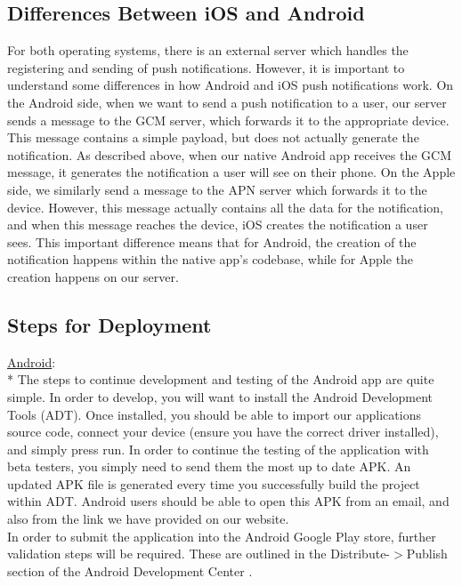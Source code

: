\documentclass[12pt,letterpaper,titlepage]{article}
\begin{document}
\subsection{Differences Between iOS and Android} \label{doc:DifferencesBetweeniOSandAndroid}

For both operating systems, there is an external server which handles the registering and sending of push notifications. However, it is important to understand some differences in how Android and iOS push notifications work. On the Android side, when we want to send a push notification to a user, our server sends a message to the GCM server, which forwards it to the appropriate device. This message contains a simple payload, but does not actually generate the notification. As described above, when our native Android app receives the GCM message, it generates the notification a user will see on their phone. On the Apple side, we similarly send a message to the APN server which forwards it to the device. However, this message actually contains all the data for the notification, and when this message reaches the device, iOS creates the notification a user sees. This important difference means that for Android, the creation of the notification happens within the native app's codebase, while for Apple the creation happens on our server.

\subsection{Steps for Deployment} \label{doc:StepsforDeployment}

\underline{Android}:\\*
The steps to continue development and testing of the Android app are quite simple. In order to develop, you will want to install the Android Development Tools (ADT)\cite{adt}. Once installed, you should be able to import our applications source code, connect your device (ensure you have the correct driver installed), and simply press run. In order to continue the testing of the application with beta testers, you simply need to send them the most up to date APK. An updated APK file is generated every time you successfully build the project within ADT. Android users should be able to open this APK from an email, and also from the link we have provided on our website.\\

In order to submit the application into the Android Google Play store, further validation steps will be required. These are outlined in the Distribute-$>$Publish section of the Android Development Center \cite{android publish}. \\
\end{document}
